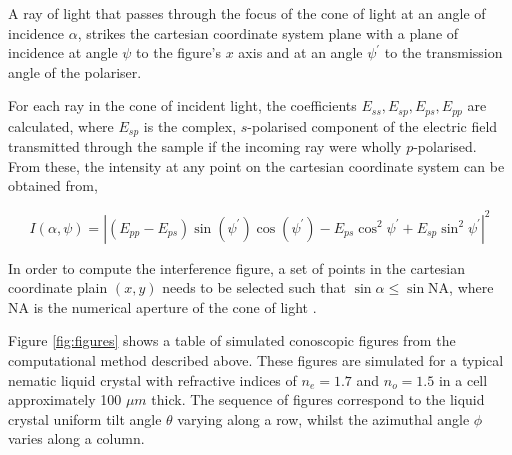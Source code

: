 A ray of light that passes through the focus of the cone of light at an angle of incidence $\alpha$, strikes the cartesian coordinate system plane with a plane of incidence at angle $\psi$ to the figure's $x$ axis and at an angle $\psi^{\prime}$ to the transmission angle of the polariser. 

For each ray in the cone of incident light, the coefficients $E_{ss},E_{sp},E_{ps},E_{pp}$ are calculated, where $E_{sp}$ is the complex, $s$-polarised component of the electric field transmitted through the sample if the incoming ray were wholly $p$-polarised. From these, the intensity at any point on the cartesian coordinate system can be obtained \cite{Cornford2008} from,

\begin{equation}
I\left(\alpha,\psi\right)=\left|\left(E_{pp}-E_{ps}\right)\sin\left(\psi^{\prime}\right)\cos\left(\psi^{\prime}\right)-E_{ps}\cos^2\psi^{\prime}+E_{sp}\sin^2\psi^{\prime}\right|^2
\end{equation}

In order to compute the interference figure, a set of points in the cartesian coordinate plain $\left(x,y\right)$ needs to be selected such that $\sin\alpha\leq\sin\text{NA}$, where NA is the numerical aperture of the cone of light \cite{Cornford2008}.

Figure \ref{fig:figures} shows a table of simulated conoscopic figures from the computational method described above. These figures are simulated for a typical nematic liquid crystal with refractive indices of $n_e=1.7$ and $n_o=1.5$ in  a cell approximately 100 $\mu m$ thick. The sequence of figures correspond to the liquid crystal uniform tilt angle $\theta$ varying along a row, whilst the azimuthal angle $\phi$ varies along a column.

